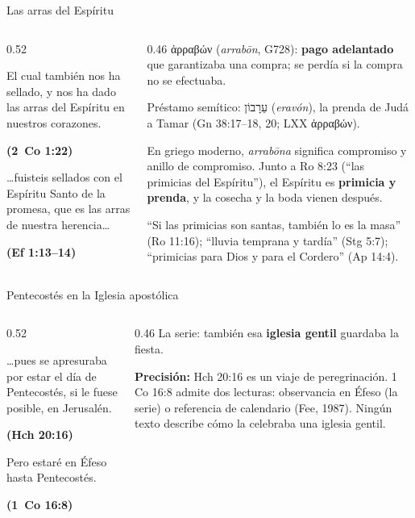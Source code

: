 \documentclass[hyperref={bookmarks=false},aspectratio=169]{beamer}
\newcommand{\heb}[1]{\mbox{\foreignlanguage{hebrew}{#1}}}
\newcommand{\grc}[1]{\foreignlanguage{ancientgreek}{#1}}
\newcommand{\fuente}[1]{\par\hfill{\upshape\bfseries\footnotesize\textcolor{tierraroja}{#1}}}
\newcommand{\destacar}[1]{\textbf{\textcolor{tierraroja}{#1}}}
\newcommand{\precision}[1]{{\footnotesize\color{sepia}\textbf{Precisión:} #1}}
\begin{document}
\begin{frame}{Las arras del Espíritu}
\begin{columns}[c,onlytextwidth]
\begin{column}{0.52\textwidth}
\begin{cita}El cual también nos ha sellado, y nos ha dado las arras del Espíritu en nuestros corazones.\fuente{(2~Co 1:22)}\end{cita}
\begin{cita}\ldots{}fuisteis sellados con el Espíritu Santo de la promesa, que es las arras de nuestra herencia\ldots\fuente{(Ef 1:13--14)}\end{cita}
\end{column}
\begin{column}{0.46\textwidth}\small\RaggedRight
\grc{ἀρραβών} (\emph{arrabōn}, G728): \destacar{pago adelantado} que garantizaba una compra; se perdía si la compra no se efectuaba.\par\smallskip
Préstamo semítico: \heb{עֵרָבוֹן} (\emph{eravón}), la prenda de Judá a Tamar (Gn 38:17--18, 20; LXX \grc{ἀρραβών}).\par\smallskip
En griego moderno, \emph{arrabōna} significa compromiso y anillo de compromiso. Junto a Ro 8:23 (``las primicias del Espíritu''), el Espíritu es \destacar{primicia y prenda}, y la cosecha y la boda vienen después.\par\smallskip\scriptsize ``Si las primicias son santas, también lo es la masa'' (Ro 11:16); ``lluvia temprana y tardía'' (Stg 5:7); ``primicias para Dios y para el Cordero'' (Ap 14:4).
\end{column}
\end{columns}
\end{frame}

\begin{frame}{Pentecostés en la Iglesia apostólica}
\begin{columns}[c,onlytextwidth]
\begin{column}{0.52\textwidth}
\begin{cita}\ldots{}pues se apresuraba por estar el día de Pentecostés, si le fuese posible, en Jerusalén.\fuente{(Hch 20:16)}\end{cita}
\begin{cita}Pero estaré en Éfeso hasta Pentecostés.\fuente{(1~Co 16:8)}\end{cita}
\end{column}
\begin{column}{0.46\textwidth}\small\RaggedRight
La serie: también esa \destacar{iglesia gentil} guardaba la fiesta.\par\medskip
\precision{Hch 20:16 es un viaje de peregrinación. 1 Co 16:8 admite dos lecturas: observancia en Éfeso (la serie) o referencia de calendario (Fee, 1987). Ningún texto describe cómo la celebraba una iglesia gentil.}
\end{column}
\end{columns}
\end{frame}
\end{document}
